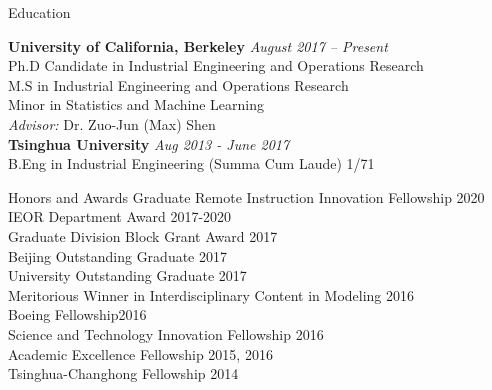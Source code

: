 \documentclass{resume} %
\begin{document}

\begin{rSection}{Education}

{\bf University of California, Berkeley} \hfill {\em August 2017 -- Present} 
\\ Ph.D Candidate in Industrial Engineering and Operations Research \hfill 
\\ M.S in Industrial Engineering and Operations Research
\\ Minor in Statistics and Machine Learning
\\ {\textit{Advisor:} Dr. Zuo-Jun (Max) Shen} 
\\{\bf Tsinghua University} \hfill {\em Aug 2013 - June 2017} 
\\ B.Eng in Industrial Engineering (Summa Cum Laude) \hfill { 1/71 }
\end{rSection}

\begin{rSection}{Honors and Awards}
Graduate Remote Instruction Innovation Fellowship \hfill {2020}\\
IEOR Department Award \hfill {2017-2020}\\
Graduate Division Block Grant Award \hfill {2017}\\
Beijing Outstanding Graduate \hfill {2017}\\
University Outstanding Graduate \hfill {2017}\\
Meritorious Winner in Interdisciplinary Content in Modeling  \hfill {2016}\\
Boeing Fellowship\hfill {2016}\\
Science and Technology Innovation Fellowship \hfill {2016}\\
Academic Excellence Fellowship \hfill {2015, 2016}\\
Tsinghua-Changhong Fellowship \hfill{2014}
\end{rSection}
\end{document}
